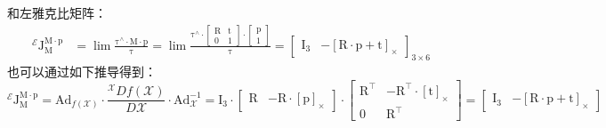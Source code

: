 \documentclass[12pt, onecolumn]{article}
\newcommand\skewmat[1]{\left[ #1 \right]_\times}
\newcommand\liehat[1]{#1^{\land}}
\newcommand\bsm[1]{\boldsymbol{\mathrm{#1}}}
\begin{document}
	和左雅克比矩阵：
	\begin{equation}
	\begin{aligned}
	^\mathcal{E}\bsm{J}_{\bsm{M}}^{\bsm{M}\cdot\bsm{p}}&=
	\lim\frac{\liehat{\bsm{\tau}}  \cdot\bsm{M}\cdot\bsm{p}}{\bsm{\tau}}
		=\lim\frac{\liehat{\bsm{\tau}}  \cdot	\begin{bmatrix}
		\bsm{R}&\bsm{t}\\\bsm{0}&1
		\end{bmatrix}\cdot\begin{bmatrix}
			\bsm{p}\\1
			\end{bmatrix}}{\bsm{\tau}}
		=\begin{bmatrix}
		\bsm{I}_3&-\skewmat{\bsm{R}\cdot\bsm{p}+\bsm{t}}
		\end{bmatrix}_{3\times 6}
	\end{aligned}
	\end{equation}
	也可以通过如下推导得到：
	\begin{equation}
	^\mathcal{E}\bsm{J}_{\bsm{M}}^{\bsm{M}\cdot\bsm{p}}=
	\bsm{Ad}_{f(\mathcal{X})}\cdot\frac{{^\mathcal{X}Df(\mathcal{X})}}{D\mathcal{X}}
		\cdot\bsm{Ad}_{\mathcal{X}}^{-1}
		=\bsm{I}_3\cdot
		\begin{bmatrix}
			\bsm{R}&-\bsm{R}\cdot\skewmat{\bsm{p}}
			\end{bmatrix}
		 \cdot\begin{bmatrix}
		 					\bsm{R}^\top&-\bsm{R}^\top\cdot\skewmat{\bsm{t}}\\
		 					\bsm{0}&\bsm{R}^\top
		 					\end{bmatrix}=
		\begin{bmatrix}
		\bsm{I}_3&-\skewmat{\bsm{R}\cdot\bsm{p}+\bsm{t}}
		\end{bmatrix}
	\end{equation}
	
	\newpage
	
	
		
	\newpage
\end{document}
